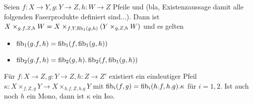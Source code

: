 \begin{satz}[Staffelung]
Seien $f: X\to Y,g : Y\to Z,h:W\to Z$ Pfeile und (bla, Existenzaussage damit alle folgenden Faserprodukte definiert sind...). Dann ist $X\times_{g.f,Z,h} W = X\times_{f,Y,\operatorname{fib}_1(g,h)} (Y\times_{g,Z,h} W)$ und es gelten
\begin{itemize}
\item $\operatorname{fib}_1(g.f,h) = \operatorname{fib}_1(f,\operatorname{fib}_1(g,h))$
\item $\operatorname{fib}_2(g.f,h) = \operatorname{fib}_2(g,h) . \operatorname{fib}_2(f,\operatorname{fib}_1(g,h))$
\end{itemize}
\end{satz}

\begin{prop}
Für $f: X\to Z, g:Y\to Z, h:Z\to Z'$ existiert ein eindeutiger Pfeil $\kappa : X\times_{f,Z,g} Y \to X\times_{h.f,Z,h.g} Y$ mit $\operatorname{fib}_i(f,g) = \operatorname{fib}_i(h.f,h.g).\kappa$ für $i=1,2$. Ist auch noch $h$ ein Mono, dann ist $\kappa$ ein Iso.
\end{prop}

